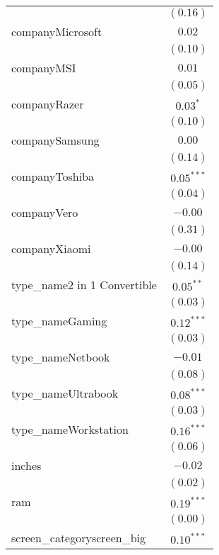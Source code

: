 \documentclass[
]{article}
\begin{document}
\begin{table}
\begin{center}
\begin{tabular}{l c}
                              & $(0.16)$      \\
companyMicrosoft              & $0.02$        \\
                              & $(0.10)$      \\
companyMSI                    & $0.01$        \\
                              & $(0.05)$      \\
companyRazer                  & $0.03^{*}$    \\
                              & $(0.10)$      \\
companySamsung                & $0.00$        \\
                              & $(0.14)$      \\
companyToshiba                & $0.05^{***}$  \\
                              & $(0.04)$      \\
companyVero                   & $-0.00$       \\
                              & $(0.31)$      \\
companyXiaomi                 & $-0.00$       \\
                              & $(0.14)$      \\
type\_name2 in 1 Convertible  & $0.05^{**}$   \\
                              & $(0.03)$      \\
type\_nameGaming              & $0.12^{***}$  \\
                              & $(0.03)$      \\
type\_nameNetbook             & $-0.01$       \\
                              & $(0.08)$      \\
type\_nameUltrabook           & $0.08^{***}$  \\
                              & $(0.03)$      \\
type\_nameWorkstation         & $0.16^{***}$  \\
                              & $(0.06)$      \\
inches                        & $-0.02$       \\
                              & $(0.02)$      \\
ram                           & $0.19^{***}$  \\
                              & $(0.00)$      \\
screen\_categoryscreen\_big   & $0.10^{***}$  \\

\end{tabular}
\end{center}
\end{table}
\end{document}
